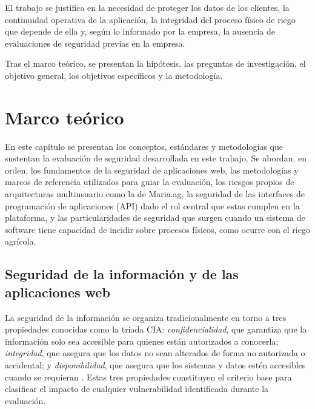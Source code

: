 \documentclass[12pt,letterpaper]{report}
\begin{document}
El trabajo se justifica en la necesidad de proteger los datos de los clientes,
la continuidad operativa de la aplicación, la integridad del proceso físico
de riego que depende de ella y, según lo informado por la empresa, la
ausencia de evaluaciones de seguridad previas en la empresa.

Tras el marco teórico, se presentan la hipótesis, las preguntas de investigación,
el objetivo general, los objetivos específicos y la metodología.

\newpage

\chapter*{Marco teórico}

En este capítulo se presentan los conceptos, estándares y metodologías que
sustentan la evaluación de seguridad desarrollada en este trabajo. Se abordan,
en orden, los fundamentos de la seguridad de aplicaciones web, las
metodologías y marcos de referencia utilizados para guiar la evaluación, los
riesgos propios de arquitecturas multiusuario como la de Maria.ag, la
seguridad de las interfaces de programación de aplicaciones (API) dado el rol
central que estas cumplen en la plataforma, y las particularidades de
seguridad que surgen cuando un sistema de software tiene capacidad de incidir
sobre procesos físicos, como ocurre con el riego agrícola.

\section*{Seguridad de la información y de las aplicaciones web}

La seguridad de la información se organiza tradicionalmente en torno a tres
propiedades conocidas como la tríada CIA: \textit{confidencialidad}, que
garantiza que la información solo sea accesible para quienes están
autorizados a conocerla; \textit{integridad}, que asegura que los datos no
sean alterados de forma no autorizada o accidental; y \textit{disponibilidad},
que asegura que los sistemas y datos estén accesibles cuando se requieran
\autocite{stallings2018}. Estas tres propiedades constituyen el criterio base
para clasificar el impacto de cualquier vulnerabilidad identificada durante la
evaluación.
\end{document}
